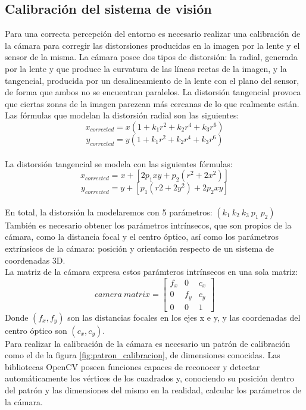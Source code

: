 \subsection{Calibración del sistema de visión}
\label{calibracion}
Para una correcta percepción del entorno es necesario realizar una calibración de la cámara para corregir las distorsiones producidas en la imagen por la lente y el sensor de la misma. La cámara posee dos tipos de distorsión: la radial, generada por la lente y que produce la curvatura de las líneas rectas de la imagen, y la tangencial, producida por un desalineamiento de la lente con el plano del sensor, de forma que ambos no se encuentran paralelos. La distorsión tangencial provoca que ciertas zonas de la imagen parezcan más cercanas de lo que realmente están.\\

Las fórmulas que modelan la distorsión radial son las siguientes:
\[x_{corrected} = x (1 + k_1 r^2 + k_2 r^4 + k_3 r^6)\]
\[y_{corrected} = y (1 + k_1 r^2 + k_2 r^4 + k_3 r^6)\]
~\\
 
La distorsión tangencial se modela con las siguientes fórmulas:
\[x_{corrected} = x + \left[2 p_1 x y + p_2 (r^2 + 2 x^2) \right] \]
\[y_{corrected} = y + \left[p_1 (r2 + 2 y^2) + 2 p_2 x y \right] \]
~\\

En total, la distorsión la modelaremos con 5 parámetros: $(k_1 ~ k_2 ~ k_3 ~ p_1 ~ p_2)$\\

También es necesario obtener los parámetros intrínsecos, que son propios de la cámara, como la distancia focal y el centro óptico, así como los parámetros extrínsicos de la cámara: posición y orientación respecto de un sistema de coordenadas 3D.\\

La matriz de la cámara expresa estos parámteros intrínsecos en una sola matriz:
\[camera ~matrix = \begin{bmatrix} f_x & 0 & c_x \\ 0 & f_y & c_y \\ 0 & 0 & 1 \end{bmatrix}\]
Donde $(f_x, f_y)$ son las distancias focales en los ejes x e y, y  las coordenadas del centro óptico son $(c_x, c_y)$.\\

Para realizar la calibración de la cámara es necesario un patrón de calibración como el de la figura \ref{fig:patron_calibracion}, de dimensiones conocidas. Las bibliotecas OpenCV poseen funciones capaces de reconocer y detectar automáticamente los vértices de los cuadrados y, conociendo su posición dentro del patrón y las dimensiones del mismo en la realidad, calcular los parámetros de la cámara.\\

